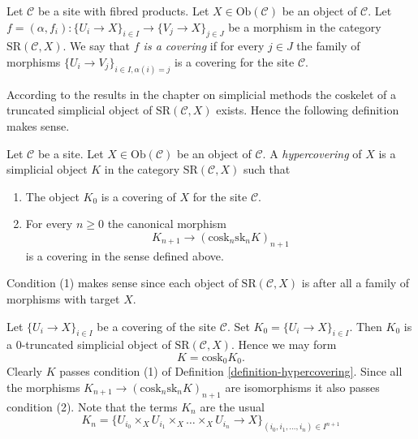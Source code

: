 \begin{definition}
\label{definition-covering-SR}
Let $\mathcal{C}$ be a site with fibred products.
Let $X \in \text{Ob}(\mathcal{C})$ be an object of $\mathcal{C}$.
Let $f = (\alpha, f_i) : \{U_i \to X\}_{i \in I} \to \{V_j \to X\}_{j \in J}$
be a morphism in the category $\text{SR}(\mathcal{C}, X)$.
We say that {\it $f$ is a covering} if for every $j \in J$ the
family of morphisms $\{U_i \to V_j\}_{i \in I, \alpha(i) = j}$
is a covering for the site $\mathcal{C}$.
\end{definition}

\noindent
According to the results in the chapter on simplicial methods the
coskelet of a truncated simplicial object of
$\text{SR}(\mathcal{C}, X)$ exists. Hence the following
definition makes sense.

\begin{definition}
\label{definition-hypercovering}
Let $\mathcal{C}$ be a site.
Let $X \in \text{Ob}(\mathcal{C})$ be an object of $\mathcal{C}$.
A {\it hypercovering} of $X$ is a simplicial object
$K$ in the category $\text{SR}(\mathcal{C}, X)$ such that
\begin{enumerate}
\item The object $K_0$ is a covering of $X$ for the site $\mathcal{C}$.
\item
For every $n \geq 0$ the canonical morphism
$$
K_{n + 1} \longrightarrow (\text{cosk}_n \text{sk}_n K)_{n + 1}
$$
is a covering in the sense defined above.
\end{enumerate}
\end{definition}

\noindent
Condition (1) makes sense since each object of
$\text{SR}(\mathcal{C}, X)$ is after all a family
of morphisms with target $X$.

\begin{example}
\label{example-cech}
Let $\{U_i \to X\}_{i \in I}$ be a covering of the site $\mathcal{C}$.
Set $K_0 = \{U_i \to X\}_{i \in I}$.
Then $K_0$ is a $0$-truncated simplicial object of
$\text{SR}(\mathcal{C}, X)$. Hence we may form
$$
K = \text{cosk}_0 K_0.
$$
Clearly $K$ passes condition (1) of Definition \ref{definition-hypercovering}.
Since all the morphisms $K_{n + 1} \to (\text{cosk}_n \text{sk}_n K)_{n + 1}$
are isomorphisms it also passes condition (2). Note that
the terms $K_n$ are the usual
$$
K_n = \{
U_{i_0} \times_X U_{i_1} \times_X \ldots \times_X U_{i_n} \to X
\}_{(i_0, i_1, \ldots, i_n) \in I^{n + 1}}
$$
\end{example}

